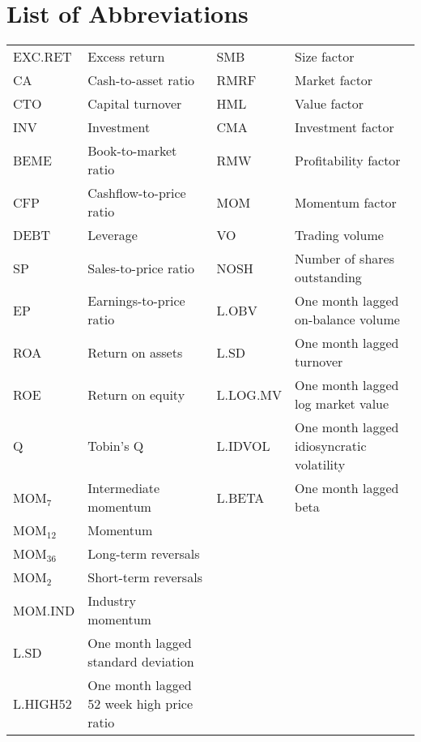 \documentclass[12pt]{article}
\begin{document}
\section*{List of Abbreviations}
\begin{table}[H] 
\setlength\extrarowheight{10pt}
\begin{tabularx}{\textwidth}{@{\extracolsep{4pt}} l Y l Y} 
EXC.RET & Excess return & SMB & Size factor\\ 
CA & Cash-to-asset ratio & RMRF & Market factor\\
CTO & Capital turnover & HML & Value factor\\
INV & Investment & CMA & Investment factor\\
BEME & Book-to-market ratio & RMW & Profitability factor\\
CFP & Cashflow-to-price ratio & MOM & Momentum factor\\
DEBT & Leverage & VO & Trading volume\\
SP & Sales-to-price ratio & NOSH & Number of shares outstanding\\
EP & Earnings-to-price ratio & L.OBV & One month lagged on-balance volume \\
ROA & Return on assets & L.SD & One month lagged turnover \\
ROE & Return on equity & L.LOG.MV & One month lagged log market value\\
Q & Tobin's Q & L.IDVOL & One month lagged idiosyncratic volatility \\
MOM$_7$ & Intermediate momentum & L.BETA & One month lagged beta\\
MOM$_{12}$ & Momentum & &\\
MOM$_{36}$ & Long-term reversals & &\\
MOM$_{2}$ & Short-term reversals & &\\
MOM.IND & Industry momentum & &\\
L.SD & One month lagged standard deviation & &\\
L.HIGH52 & One month lagged 52 week high price ratio & &\\
\end{tabularx}
\end{table} 

\newpage

\end{document}
